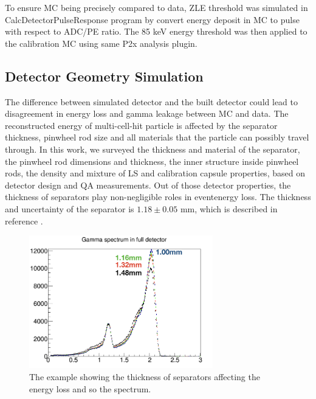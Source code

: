 To ensure MC being precisely compared to data, ZLE threshold was simulated in CalcDetectorPulseResponse program by convert energy deposit in MC to pulse with respect to ADC/PE ratio.
The 85 keV energy threshold was then applied to the calibration MC using same P2x analysis plugin.

\subsection{Detector Geometry Simulation}
The difference between simulated detector and the built detector could lead to disagreement in energy loss and gamma leakage between MC and data. 
The reconstructed energy of multi-cell-hit particle is affected by the separator thickness, pinwheel rod size and all materials that the particle can possibly travel through. 
In this work, we surveyed the thickness and material of the separator, the pinwheel rod dimensions and thickness, the inner structure inside pinwheel rods, the density and mixture of LS and calibration capsule properties, based on detector design and QA measurements.
Out of those detector properties, the thickness of separators play non-negligible roles in eventenergy loss. 
The thickness and uncertainty of the separator is $1.18 \pm 0.05$ mm, which is described in reference \cite{docThick}.

\begin{figure}[h!]
\centering
\includegraphics[width=80mm]{figures/thickness.png}
\caption{The example showing the thickness of separators affecting the energy loss and so the spectrum.}
\label{fig:thickness}
\end{figure}

